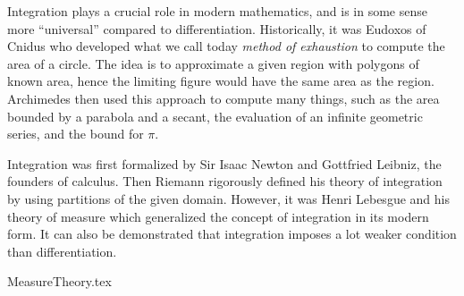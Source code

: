 \label{part:measure}

Integration plays a crucial role in modern mathematics,
and is in some sense more ``universal'' compared to differentiation.
Historically, it was Eudoxos of Cnidus
who developed what we call today \emph{method of exhaustion}
to compute the area of a circle.
The idea is to approximate a given region with polygons of known area,
hence the limiting figure would have the same area as the region.
Archimedes then used this approach to compute many things, such as
the area bounded by a parabola and a secant,
the evaluation of an infinite geometric series,
and the bound for \(\pi\).

Integration was first formalized by
Sir Isaac Newton and Gottfried Leibniz, the founders of calculus.
Then Riemann rigorously defined his theory of integration
by using partitions of the given domain.
However, it was Henri Lebesgue and his theory of measure
which generalized the concept of integration in its modern form.
It can also be demonstrated that
integration imposes a lot weaker condition than differentiation.

{MeasureTheory.tex}